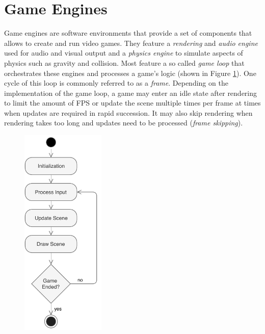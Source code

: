 \section{Game Engines}
Game engines are software environments that provide a set of components that allows to create and run video games. They feature a \emph{rendering} and \emph{audio engine} used for audio and visual output and a \emph{physics engine} to simulate aspects of physics such as gravity and collision. Most feature a so called \emph{game loop} that orchestrates these engines and processes a game's logic (shown in Figure \ref{fig:game-loop}). One cycle of this loop is commonly referred to as a \emph{frame}. Depending on the implementation of the game loop, a game may enter an idle state after rendering to limit the amount of \ac{FPS} or update the scene multiple times per frame at times when updates are required in rapid succession. It may also skip rendering when rendering takes too long and updates need to be processed (\emph{frame skipping}).

\begin{figure}[t]
    \centering
    \noindent\includegraphics[width=4cm]{tex/img/ch03/GameLoop_04.pdf}
    \label{fig:game-loop}
\end{figure}

